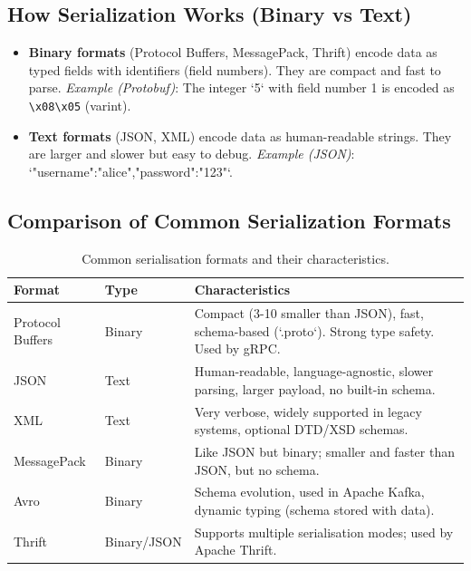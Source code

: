 \documentclass[a4paper]{article}
\begin{document}
\subsection{How Serialization Works (Binary vs Text)}
\begin{itemize}
    \item \textbf{Binary formats} (Protocol Buffers, MessagePack, Thrift) encode data as typed fields with identifiers (field numbers). They are compact and fast to parse.  
        \textit{Example (Protobuf)}: The integer `5` with field number 1 is encoded as \verb|\x08\x05| (varint).
    \item \textbf{Text formats} (JSON, XML) encode data as human-readable strings. They are larger and slower but easy to debug.  
        \textit{Example (JSON)}: `{"username":"alice","password":"123"}`.
\end{itemize}

\subsection{Comparison of Common Serialization Formats}
\begin{table}[H]
\centering
\begin{tabular}{p{3.5cm}p{2.5cm}p{8cm}}
\toprule
\textbf{Format} & \textbf{Type} & \textbf{Characteristics} \\
\midrule
Protocol Buffers & Binary & Compact (3-10 smaller than JSON), fast, schema-based (`.proto`). Strong type safety. Used by gRPC. \\
JSON & Text & Human-readable, language-agnostic, slower parsing, larger payload, no built-in schema. \\
XML & Text & Very verbose, widely supported in legacy systems, optional DTD/XSD schemas. \\
MessagePack & Binary & Like JSON but binary; smaller and faster than JSON, but no schema. \\
Avro & Binary & Schema evolution, used in Apache Kafka, dynamic typing (schema stored with data). \\
Thrift & Binary/JSON & Supports multiple serialisation modes; used by Apache Thrift. \\
\bottomrule
\end{tabular}
\caption{Common serialisation formats and their characteristics.}
\label{tab:serialization}
\end{table}
\end{document}
